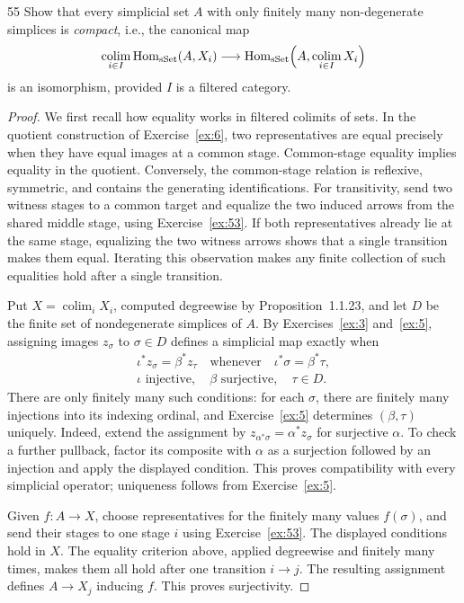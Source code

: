 \begin{exercise}{55}
Show that every simplicial set $A$ with only finitely many non-degenerate
simplices is \emph{compact}, i.e., the canonical map
\[
 \operatorname*{colim}_{i\in I}\mathrm{Hom}_{\mathrm{sSet}}(A,X_i)
 \longrightarrow
 \mathrm{Hom}_{\mathrm{sSet}}\Bigl(A,\operatorname*{colim}_{i\in I}X_i\Bigr)
\]
is an isomorphism, provided $I$ is a filtered category.

\begin{proof}
We first recall how equality works in filtered colimits of sets.
In the quotient construction of Exercise~\ref{ex:6}, two
representatives are equal precisely when they have equal images
at a common stage. Common-stage equality implies equality
in the quotient. Conversely, the common-stage relation is reflexive,
symmetric, and contains the generating identifications.
For transitivity, send two witness stages to a common target
and equalize the two induced arrows from the shared middle stage,
using Exercise~\ref{ex:53}.
If both representatives already lie at the same stage,
equalizing the two witness arrows shows that a single transition
makes them equal. Iterating this observation makes any finite
collection of such equalities hold after a single transition.

Put $X=\operatorname*{colim}_iX_i$, computed degreewise by
Proposition~1.1.23, and let $D$ be the finite set of nondegenerate
simplices of $A$.
By Exercises~\ref{ex:3} and~\ref{ex:5}, assigning images $z_\sigma$
to $\sigma\in D$ defines a simplicial map exactly when
\[
 \begin{gathered}
  \iota^*z_\sigma=\beta^*z_\tau
  \quad\text{whenever}\quad \iota^*\sigma=\beta^*\tau,\\
  \iota\text{ injective},\quad
  \beta\text{ surjective},\quad\tau\in D.
 \end{gathered}
\]
There are only finitely many such conditions: for each $\sigma$,
there are finitely many injections into its indexing ordinal,
and Exercise~\ref{ex:5} determines $(\beta,\tau)$ uniquely.
Indeed, extend the assignment by
$z_{\alpha^*\sigma}=\alpha^*z_\sigma$ for surjective $\alpha$.
To check a further pullback, factor its composite with $\alpha$
as a surjection followed by an injection and apply the displayed
condition. This proves compatibility with every simplicial operator;
uniqueness follows from Exercise~\ref{ex:5}.

Given $f\colon A\to X$, choose representatives for the finitely
many values $f(\sigma)$, and send their stages to one stage $i$
using Exercise~\ref{ex:53}.
The displayed conditions hold in $X$.
The equality criterion above, applied degreewise and finitely
many times, makes them all hold after one transition $i\to j$.
The resulting assignment defines $A\to X_j$ inducing $f$.
This proves surjectivity.


\end{proof}
\end{exercise}
